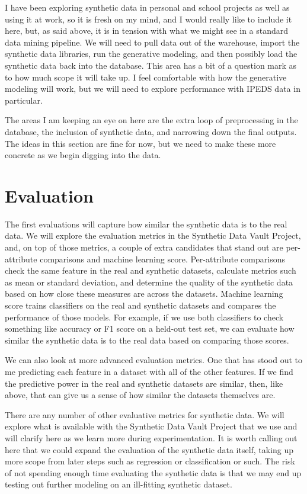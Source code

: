 \documentclass[sigconf, authorversion, nonacm]{acmart}
\begin{document}
    I have been exploring synthetic data in personal and school projects as well as using it at work, so it is fresh on my mind, and I would really like to include it here, but, as said above, it is in tension with what we might see in a standard data mining pipeline. We will need to pull data out of the warehouse, import the synthetic data libraries, run the generative modeling, and then possibly load the synthetic data back into the database. This area has a bit of a question mark as to how much scope it will take up. I feel comfortable with how the generative modeling will work, but we will need to explore performance with IPEDS data in particular.

    The areas I am keeping an eye on here are the extra loop of preprocessing in the database, the inclusion of synthetic data, and narrowing down the final outputs. The ideas in this section are fine for now, but we need to make these more concrete as we begin digging into the data.

\section{Evaluation}
    The first evaluations will capture how similar the synthetic data is to the real data. We will explore the evaluation metrics in the Synthetic Data Vault Project, and, on top of those metrics, a couple of extra candidates that stand out are per-attribute comparisons and machine learning score. Per-attribute comparisons check the same feature in the real and synthetic datasets, calculate metrics such as mean or standard deviation, and determine the quality of the synthetic data based on how close these measures are across the datasets. Machine learning score trains classifiers on the real and synthetic datasets and compares the performance of those models. For example, if we use both classifiers to check something like accuracy or F1 score on a held-out test set, we can evaluate how similar the synthetic data is to the real data based on comparing those scores.

    We can also look at more advanced evaluation metrics. One that has stood out to me predicting each feature in a dataset with all of the other features. If we find the predictive power in the real and synthetic datasets are similar, then, like above, that can give us a sense of how similar the datasets themselves are.

    There are any number of other evaluative metrics for synthetic data. We will explore what is available with the Synthetic Data Vault Project that we use and will clarify here as we learn more during experimentation. It is worth calling out here that we could expand the evaluation of the synthetic data itself, taking up more scope from later steps such as regression or classification or such. The risk of not spending enough time evaluating the synthetic data is that we may end up testing out further modeling on an ill-fitting synthetic dataset.
\end{document}
